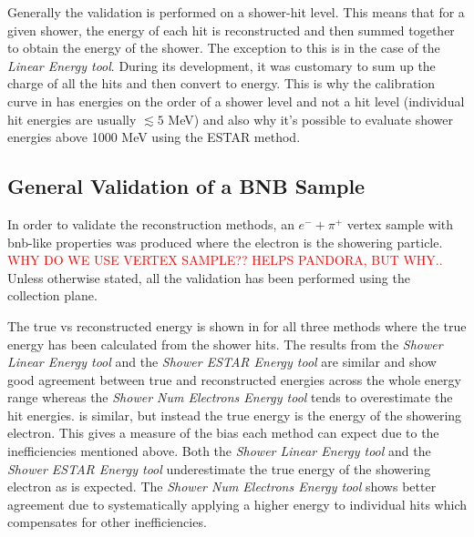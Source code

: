 Generally the validation is performed on a shower-hit level. This means that for a given shower, the energy of each hit is reconstructed and then summed together to obtain the energy of the shower. The exception to this is in the case of the \textit{Linear Energy tool}. During its development, it was customary to sum up the charge of all the hits and then convert to energy. This is why the calibration curve in  has energies on the order of a shower level and not a hit level (individual hit energies are usually $\lesssim 5$ MeV) and also why it's possible to evaluate shower energies above 1000 MeV using the ESTAR method. 

\subsection{General Validation of a BNB Sample}

In order to validate the reconstruction methods, an $e^- + \pi^+$ vertex sample with \gls{bnb}-like properties was produced where the electron is the showering particle. \textcolor{red}{WHY DO WE USE VERTEX SAMPLE?? HELPS PANDORA, BUT WHY..} Unless otherwise stated, all the validation has been performed using the collection plane. 

The true vs reconstructed energy is shown in  for all three methods where the true energy has been calculated from the shower hits. The results from the \textit{Shower Linear Energy tool} and the \textit{Shower ESTAR Energy tool} are similar and show good agreement between true and reconstructed energies across the whole energy range whereas the \textit{Shower Num Electrons Energy tool} tends to overestimate the hit energies.  is similar, but instead the true energy is the energy of the showering electron. This gives a measure of the bias each method can expect due to the inefficiencies mentioned above. Both the \textit{Shower Linear Energy tool} and the \textit{Shower ESTAR Energy tool} underestimate the true energy of the showering electron as is expected. The \textit{Shower Num Electrons Energy tool} shows better agreement due to systematically applying a higher energy to individual hits which compensates for other inefficiencies. 

